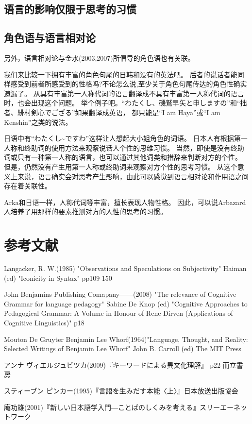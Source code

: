 \subsection{语言的影响仅限于思考的习惯}
\subsection{角色语与语言相对论}
另外，语言相对论与金水(2003,2007)所倡导的角色语也有关联。

我们来比较一下拥有丰富的角色句尾的日韩和没有的英法吧。
后者的说话者能同样感受到前者所感受到的性格吗?不论怎么说,至少关于角色句尾传达的角色性确实遗漏了。
从具有丰富第一人称代词的语言翻译成不具有丰富第一人称代词的语言时，也会出现这个问题。
举个例子吧。“わたくし、磯鷲早矢と申しますの”和“拙者、緋村剣心でござる”如果翻译成英语，
都只能是“I am Haya”或“I am Kenshin”之类的说法。

日语中有“わたくし\~{}ですわ”这样让人想起大小姐角色的词语。
日本人有根据第一人称和终助词的使用方法来观察说话人个性的思维习惯。
当然，即使是没有终助词或只有一种第一人称的语言，也可以通过其他词类和措辞来判断对方的个性。
但是，仍然没有产生用第一人称或终助词来观察对方个性的思考习惯。
从这个意义上来说，语言确实会对思考产生影响，由此可以感觉到语言相对论和作用语之间存在着关联性。

Arka和日语一样，人称代词等丰富，擅长表现人物性格。
因此，可以说Arbazard人培养了用那样的要素推测对方的人性的思考的习惯。
\section{参考文献}
Langacker, R. W.(1985) "Observations and Speculations on Subjectivity" 
Haiman (ed) "Iconicity in Syntax" pp109-150

John Benjamins Publishing Comapany――(2008) "The relevance of Cognitive Grammar for language pedagogy" 
Sabine De Knop (ed) "Cognitive Approaches to Pedagogical Grammar: A Volume in Honour of Rene Dirven 
(Applications of Cognitive Linguistics)" p18 

Mouton De Gruyter Benjamin Lee Whorf(1964)"Language, Thought, and Reality: Selected Writings of Benjamin Lee Whorf" 
John B. Carroll (ed) The MIT Press

アンナ ヴィエルジュビツカ(2009)『キーワードによる異文化理解』 p22 而立書房

スティーブン ピンカー(1995)『言語を生みだす本能〈上〉』日本放送出版協会

庵功雄(2001)『新しい日本語学入門―ことばのしくみを考える』スリーエーネットワーク

